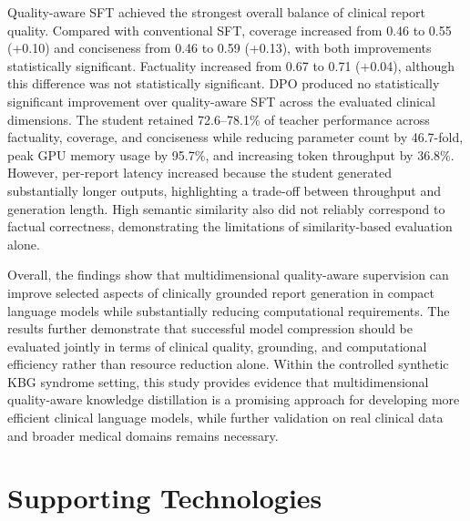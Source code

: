 \documentclass[ %
                    author={Aman Kumar Singh},
                supervisor={Dr. Edwin Simpson},
                    degree={MSc},
                     title={Quality-Aware Knowledge Distillation of Large Language Models for Efficient Personalised Clinical Report Generation},
                  subtitle={},
                      type={},
                      year={2021}]{dissertation}
\begin{document}
Quality-aware SFT achieved the strongest overall balance of clinical report
quality. Compared with conventional SFT, coverage increased from 0.46 to 0.55
(+0.10) and conciseness from 0.46 to 0.59 (+0.13), with both improvements
statistically significant. Factuality increased from 0.67 to 0.71 (+0.04),
although this difference was not statistically significant. DPO produced no
statistically significant improvement over quality-aware SFT across the
evaluated clinical dimensions. The student retained 72.6--78.1\% of teacher
performance across factuality, coverage, and conciseness while reducing
parameter count by 46.7-fold, peak GPU memory usage by 95.7\%, and increasing
token throughput by 36.8\%. However, per-report latency increased because the
student generated substantially longer outputs, highlighting a trade-off
between throughput and generation length. High semantic similarity also did
not reliably correspond to factual correctness, demonstrating the limitations
of similarity-based evaluation alone.

Overall, the findings show that multidimensional quality-aware supervision can
improve selected aspects of clinically grounded report generation in compact
language models while substantially reducing computational requirements. The
results further demonstrate that successful model compression should be
evaluated jointly in terms of clinical quality, grounding, and computational
efficiency rather than resource reduction alone. Within the controlled
synthetic KBG syndrome setting, this study provides evidence that
multidimensional quality-aware knowledge distillation is a promising approach
for developing more efficient clinical language models, while further
validation on real clinical data and broader medical domains remains necessary.









\chapter*{Supporting Technologies}
\end{document}
